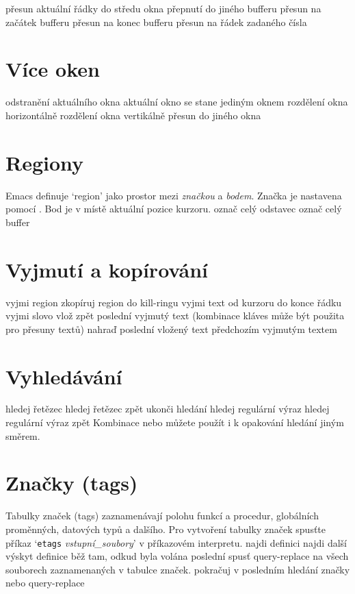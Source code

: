  přesun aktuální řádky do středu okna
 přepnutí do jiného bufferu
 přesun na začátek bufferu
 přesun na konec bufferu
 přesun na řádek zadaného čísla

\section{Více oken}

 odstranění aktuálního okna
 aktuální okno se stane jediným oknem
 rozdělení okna horizontálně
 rozdělení okna vertikálně
 přesun do jiného okna

\section{Regiony}

Emacs definuje `region' jako prostor mezi {\it značkou\/} a
{\it bodem}. Značka je nastavena pomocí .
Bod je v místě aktuální pozice kurzoru.
\askip
{} označ celý odstavec
 označ celý buffer

\section{Vyjmutí a kopírování}

 vyjmi region
 zkopíruj region do kill-ringu
 vyjmi text od kurzoru do konce řádku
 vyjmi slovo
 vlož zpět poslední vyjmutý text (kombinace kláves 
          může být použita pro přesuny textů)
 nahraď poslední vložený text předchozím vyjmutým textem

\section{Vyhledávání}

 hledej řetězec
 hledej řetězec zpět
 ukonči hledání
 hledej regulární výraz
 hledej regulární výraz zpět
\askip
Kombinace  nebo  můžete použít i k opakování hledání
jiným směrem.

\section{Značky (tags)}

Tabulky značek (tags) zaznamenávají polohu funkcí a procedur, globálních
proměnných, datových typů a dalšího. Pro vytvoření tabulky značek spusťte
příkaz `{\tt etags} {\it vstupní\_soubory}' v příkazovém interpretu.
\askip
{} najdi definici
 najdi další výskyt definice
 běž tam, odkud byla volána poslední 
 spusť query-replace na všech souborech
zaznamenaných v tabulce značek.
 pokračuj v posledním hledání značky nebo query-replace

